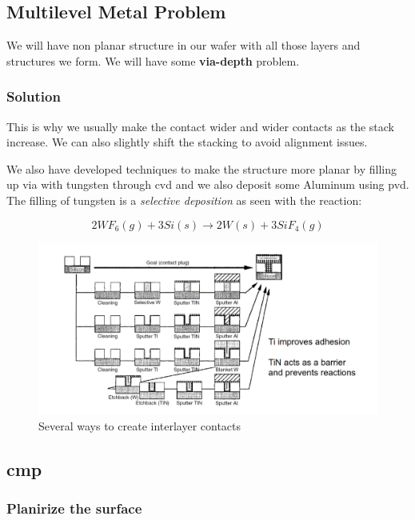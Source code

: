 \documentclass{report}
\begin{document}
\subsection{Multilevel Metal Problem}

We will have non planar structure in our wafer with all those layers and structures we form. We will have some \textbf{via-depth} problem.

\subsubsection{Solution}

This is why we usually make the contact wider and wider contacts as the stack increase. We can also slightly shift the stacking to avoid alignment issues.

We also have developed techniques to make the structure more planar by filling up via with tungsten through \gls{cvd} and we also deposit some Aluminum using \gls{pvd}. The filling of tungsten is a \textit{selective deposition} as seen with the reaction:

\begin{equation}
    2 WF_6 (g) + 3 Si (s) \longrightarrow 2 W (s) + 3SiF_4 (g)
\end{equation}

\begin{figure}[H]
    \centering
    \includegraphics[width=0.75\linewidth]{contact.png}
    \caption{Several ways  to create interlayer contacts}
    \label{fig:enter-label}
\end{figure}

\subsection{\gls{cmp}}

\subsubsection{Planirize the surface}
\end{document}

